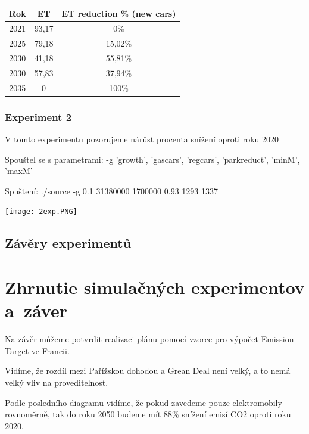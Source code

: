 \documentclass[a4paper, 11pt]{article}
\begin{document}
    \begin{center}
        \begin{tabular}{|c|c|c|}
        \hline
         Rok & ET & ET reduction \% (new cars) \\ 
         \hline
         2021 & 93,17 & 0\% \\  
         \hline
         2025 & 79,18 & 15,02\% \\
         \hline
         2030 & 41,18 & 55,81\% \\  
         \hline\hline
         2030 & 57,83 & 37,94\% \\  
         \hline
         2035 & 0 & 100\% \\
         \hline
        \end{tabular}
    \end{center}
    
    \subsubsection{Experiment 2}
	
    V tomto experimentu pozorujeme nárůst procenta snížení oproti roku 2020
    
    Spouštel se s parametrami: -g 'growth', 'gascars', 'regcars', 'parkreduct', 'minM', 'maxM'
    
	Spuštení: ./source -g 0.1 31380000 1700000 0.93 1293 1337
	
	\texttt{[image: 2exp.PNG]}
	
	\subsection{Závěry experimentů}

	\section{Zhrnutie simulačných experimentov a~záver}
	Na závěr můžeme potvrdit realizaci plánu pomocí vzorce pro výpočet Emission Target ve Francii.
	
	\vspace*{5mm}
	
    Vidíme, že rozdíl mezi Pařížskou dohodou a Grean Deal není velký, a to nemá velký vliv na proveditelnost.
    
    \vspace*{5mm}
    
    Podle posledního diagramu vidíme, že pokud zavedeme pouze elektromobily rovnoměrně, tak do roku 2050 budeme mít 88\% snížení emisí CO2 oproti roku 2020.
	
                                                    

	
	
	

	\clearpage
	\nocite{*}
	\renewcommand{\refname}{Literatura}
	
	
\end{document}
